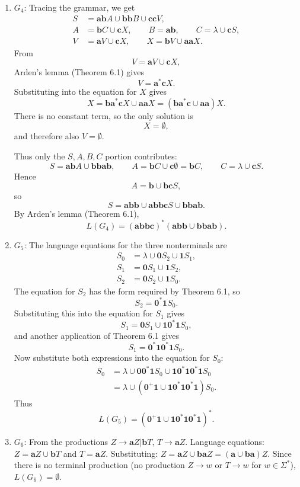 \begin{enumerate}[{8.}1. ]
\begin{enumerate}
\item $G_4$: Tracing the grammar, we get
\[
\begin{aligned}
S &= \pmb{ab}A \cup \pmb{bb}B \cup \pmb{cc}V,\\
A &= \pmb{b}C \cup \pmb{c}X,\qquad
B = \pmb{ab},\qquad
C = \lambda \cup \pmb{c}S,\\
V &= \pmb{a}V \cup \pmb{c}X,\qquad
X = \pmb{b}V \cup \pmb{aa}X.
\end{aligned}
\]
From
\[
V=\pmb{a}V\cup\pmb{c}X,
\]
Arden's lemma (Theorem 6.1) gives
\[
V=\pmb{a}^*\pmb{c}X.
\]
Substituting into the equation for $X$ gives
\[
X=\pmb{b}\pmb{a}^*\pmb{c}X\cup\pmb{aa}X
  =(\pmb{b}\pmb{a}^*\pmb{c}\cup\pmb{aa})X.
\]
There is no constant term, so the only solution is
\[
X=\emptyset,
\]
and therefore also $V=\emptyset$.

Thus only the $S,A,B,C$ portion contributes:
\[
S=\pmb{ab}A\cup\pmb{bbab},\qquad
A=\pmb{b}C\cup\pmb{c}\emptyset=\pmb{b}C,\qquad
C=\lambda\cup\pmb{c}S.
\]
Hence
\[
A=\pmb{b}\cup\pmb{bc}S,
\]
so
\[
S=\pmb{abb}\cup\pmb{abbc}S\cup\pmb{bbab}.
\]
By Arden's lemma (Theorem 6.1),
\[
L(G_4)=(\pmb{abbc})^*(\pmb{abb}\cup\pmb{bbab}).
\]

\item $G_5$: The language equations for the three nonterminals are
\[
\begin{aligned}
S_0 &= \lambda \cup \pmb{0}S_2 \cup \pmb{1}S_1,\\
S_1 &= \pmb{0}S_1 \cup \pmb{1}S_2,\\
S_2 &= \pmb{0}S_2 \cup \pmb{1}S_0.
\end{aligned}
\]
The equation for $S_2$ has the form required by Theorem 6.1, so
\[
S_2=\pmb{0}^*\pmb{1}S_0.
\]
Substituting this into the equation for $S_1$ gives
\[
S_1=\pmb{0}S_1\cup\pmb{1}\pmb{0}^*\pmb{1}S_0,
\]
and another application of Theorem 6.1 gives
\[
S_1=\pmb{0}^*\pmb{1}\pmb{0}^*\pmb{1}S_0.
\]
Now substitute both expressions into the equation for $S_0$:
\[
\begin{aligned}
S_0
&=\lambda\cup\pmb{0}\pmb{0}^*\pmb{1}S_0
  \cup \pmb{1}\pmb{0}^*\pmb{1}\pmb{0}^*\pmb{1}S_0\\
&=\lambda\cup(\pmb{0}^+\pmb{1}\cup
  \pmb{1}\pmb{0}^*\pmb{1}\pmb{0}^*\pmb{1})S_0.
\end{aligned}
\]
Thus
\[
L(G_5)=(\pmb{0}^+\pmb{1}\cup
\pmb{1}\pmb{0}^*\pmb{1}\pmb{0}^*\pmb{1})^*.
\]

\item $G_6$: From the productions $Z \to \pmb{a}Z | \pmb{b}T$, $T \to \pmb{a}Z$. Language equations: $Z = \pmb{a}Z \cup \pmb{b}T$ and $T = \pmb{a}Z$. Substituting: $Z = \pmb{a}Z \cup \pmb{ba}Z = (\pmb{a}\cup\pmb{ba})Z$. Since there is no terminal production (no production $Z \to w$ or $T \to w$ for $w \in \Sigma^*$), $L(G_6) = \emptyset$.


\end{enumerate}
\end{enumerate}
